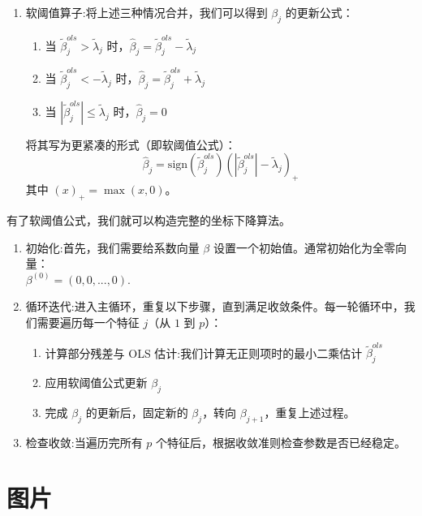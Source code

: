 \documentclass[11pt, a4paper]{article}
\begin{document}
\begin{enumerate}
\begin{enumerate}
    \end{enumerate}
    \item 软阈值算子:将上述三种情况合并，我们可以得到 $\beta_j$ 的更新公式：\begin{enumerate}
        \item 当 $\tilde{\beta}_j^{ols} > \tilde{\lambda}_j$ 时，$\hat{\beta}_j = \tilde{\beta}_j^{ols} - \tilde{\lambda}_j$
        \item 当 $\tilde{\beta}_j^{ols} < -\tilde{\lambda}_j$ 时，$\hat{\beta}_j = \tilde{\beta}_j^{ols} + \tilde{\lambda}_j$
        \item 当 $|\tilde{\beta}_j^{ols}| \le \tilde{\lambda}_j$ 时，$\hat{\beta}_j = 0$
    \end{enumerate}
    将其写为更紧凑的形式（即软阈值公式）：$$\hat{\beta}_j = \text{sign}(\tilde{\beta}_j^{ols})(|\tilde{\beta}_j^{ols}| - \tilde{\lambda}_j)_+$$其中 $(x)_+ = \max(x, 0)$。
\end{enumerate}
有了软阈值公式，我们就可以构造完整的坐标下降算法。
\begin{enumerate}
    \item 初始化:首先，我们需要给系数向量 $\beta$ 设置一个初始值。通常初始化为全零向量：\\$\beta^{(0)} = (0, 0, ..., 0).$
    \item 循环迭代:进入主循环，重复以下步骤，直到满足收敛条件。每一轮循环中，我们需要遍历每一个特征 $j$（从 $1$ 到 $p$）：\begin{enumerate}
        \item 计算部分残差与 OLS 估计:我们计算无正则项时的最小二乘估计 $\tilde{\beta}_j^{ols}$
        \item 应用软阈值公式更新 $\beta_j$
        \item 完成 $\beta_j$ 的更新后，固定新的 $\beta_j$，转向 $\beta_{j+1}$，重复上述过程。
    \end{enumerate}
    \item 检查收敛:当遍历完所有 $p$ 个特征后，根据收敛准则检查参数是否已经稳定。
\end{enumerate}
\clearpage
\section{图片}

\end{document}

